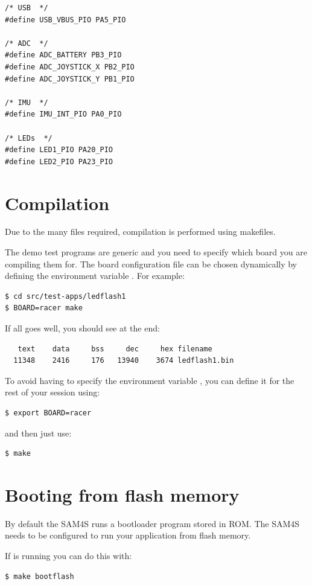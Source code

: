 \begin{verbatim}
/* USB  */
#define USB_VBUS_PIO PA5_PIO

/* ADC  */
#define ADC_BATTERY PB3_PIO
#define ADC_JOYSTICK_X PB2_PIO
#define ADC_JOYSTICK_Y PB1_PIO

/* IMU  */
#define IMU_INT_PIO PA0_PIO

/* LEDs  */
#define LED1_PIO PA20_PIO
#define LED2_PIO PA23_PIO
\end{verbatim}


\section{Compilation}
\label{compilation}

Due to the many files required, compilation is performed using
makefiles.

The demo test programs are generic and you need to specify which board
you are compiling them for. The board configuration file can be chosen
dynamically by defining the environment variable . For
example:
%
\begin{verbatim}
$ cd src/test-apps/ledflash1
$ BOARD=racer make
\end{verbatim}

If all goes well, you should see at the end:
%
\begin{verbatim}
   text    data     bss     dec     hex filename
  11348	   2416	    176	  13940	   3674	ledflash1.bin
\end{verbatim}

To avoid having to specify the environment variable , you
can define it for the rest of your session using:
%
\begin{verbatim}
$ export BOARD=racer
\end{verbatim}
%
and then just use:
%
\begin{verbatim}
$ make
\end{verbatim}

\section{Booting from flash memory}
\label{booting-from-flash-memory}

By default the SAM4S runs a bootloader program stored in ROM. The SAM4S
needs to be configured to run your application from flash memory.

If  is running you can do this with:

\begin{verbatim}
$ make bootflash
\end{verbatim}

